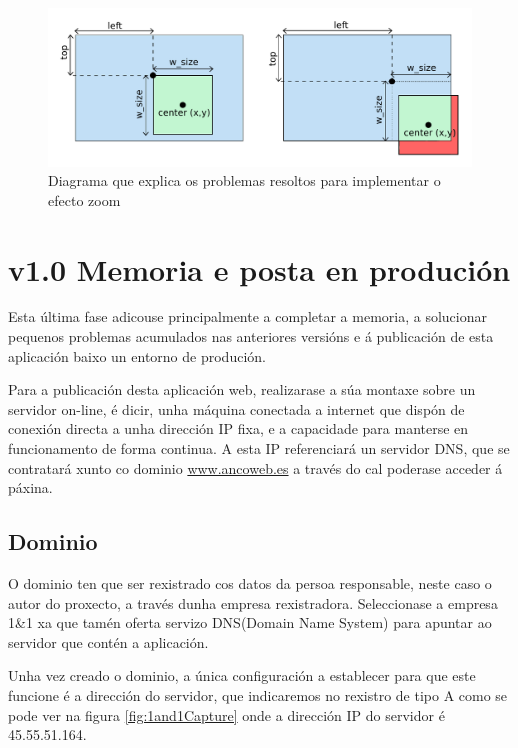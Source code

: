         \begin{figure}[htp]
        \begin{center}
            \includegraphics[scale=0.75]{figures/centerToLeftTop.pdf}
            \caption{Diagrama que explica os problemas resoltos para implementar o efecto zoom}
        \label{fig:centerToLeftTop}
        \end{center}
        \end{figure}

\section{v1.0 Memoria e posta en produción}
    Esta última fase adicouse principalmente a completar a memoria, a solucionar pequenos problemas
    acumulados nas anteriores versións e á publicación de esta aplicación baixo un entorno de 
    produción.
    
    Para a publicación desta aplicación web, realizarase a súa montaxe sobre un servidor on-line,
    é dicir, unha máquina conectada a internet que dispón de conexión directa a unha dirección IP
    fixa, e a capacidade para manterse en funcionamento de forma continua. A esta IP referenciará un
    servidor DNS, que se contratará xunto co dominio \url{www.ancoweb.es} a través do cal poderase
    acceder á páxina.

    \subsection{Dominio}
        O dominio ten que ser rexistrado cos datos da persoa responsable, neste caso o autor do 
        proxecto, a través dunha empresa rexistradora. Seleccionase a empresa 1\&1
        \cite{1and1-website} xa que tamén oferta servizo DNS(Domain Name System) para apuntar ao 
        servidor que contén a aplicación.
        
        Unha vez creado o dominio, a única configuración a establecer para que este funcione 
        é a dirección do servidor, que indicaremos no rexistro de tipo A como se pode
        ver na figura \ref{fig:1and1Capture} onde a dirección IP do servidor é 45.55.51.164.

